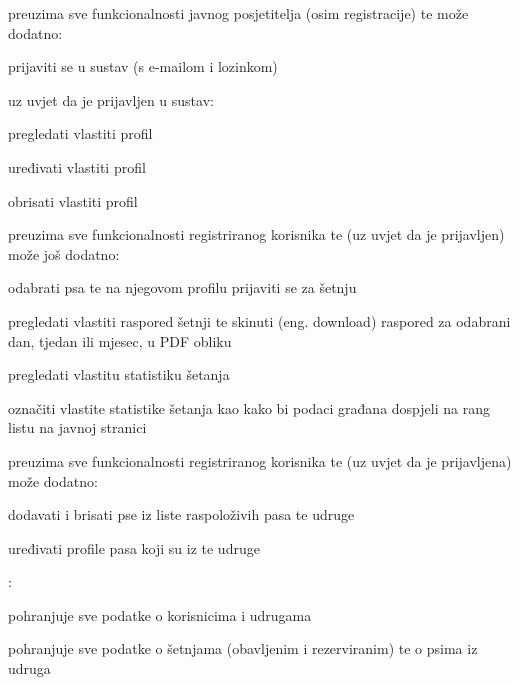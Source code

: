 \begin{packed_enum}
			\item  {} preuzima sve funkcionalnosti javnog posjetitelja (osim registracije) te može dodatno:
			\begin{packed_enum}
				\item prijaviti se u sustav (s e-mailom i lozinkom)
				\item uz uvjet da je prijavljen u sustav:
				\item[]
				\begin{packed_enum}
					\item pregledati vlastiti profil
					\item uređivati vlastiti profil
					\item obrisati vlastiti profil
				\end{packed_enum}	
			\end{packed_enum}
			\vspace{5mm}
		
			\item  {} preuzima sve funkcionalnosti registriranog korisnika te (uz uvjet da je prijavljen) može još dodatno:
			\begin{packed_enum}
				\item odabrati psa te na njegovom profilu prijaviti se za šetnju
				\item pregledati vlastiti raspored šetnji te skinuti (eng. download) raspored za odabrani dan, tjedan ili mjesec, u PDF obliku
				\item pregledati vlastitu statistiku šetanja
				\item označiti vlastite statistike šetanja kao  kako bi podaci građana dospjeli na rang listu na javnoj stranici
			\end{packed_enum}
			\vspace{5mm}
		
			\item  {} preuzima sve funkcionalnosti registriranog korisnika te (uz uvjet da je prijavljena) može dodatno:
			\begin{packed_enum}
				\item dodavati i brisati pse iz liste raspoloživih pasa te udruge
				\item uređivati profile pasa koji su iz te udruge 
			\end{packed_enum}
			\vspace{5mm}
		
		
			\item  \underbar{Baza podataka (sudionik)}:
			\begin{packed_enum}
				\item pohranjuje sve podatke o korisnicima i udrugama 
				\item pohranjuje sve podatke o šetnjama (obavljenim i rezerviranim) te o psima iz udruga 
			\end{packed_enum}
		
		\end{packed_enum}
		
